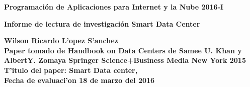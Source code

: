 \documentclass[12pt]{article}
\begin{document}
	
\begin{center}
	{\Large \textbf{Programaci\'{o}n de Aplicaciones para Internet y la Nube  \hspace{1cm}	2016-I}}\\
\end{center}

	\begin{flushright}
		{\large \textbf{	Informe de lectura de investigación Smart Data Center}}
		
	\end{flushright}
	\textbf{Wilson Ricardo L'opez S'anchez\\	
	Paper tomado de Handbook on Data Centers de Samee U. Khan y AlbertY. Zomaya Springer Science+Business Media New York 2015	\\	
	T'itulo del paper: Smart Data center,	\\	
	Fecha de evaluaci'on 18 de marzo del 2016\\}\\
\\
\\
\end{document}
